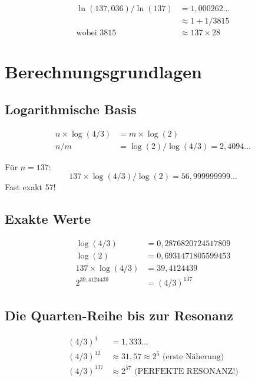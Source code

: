 	\begin{align}
		\ln(137{,}036) / \ln(137) &= 1{,}000262...\\
		&\approx 1 + 1/3815\\
		\text{wobei } 3815 &\approx 137 \times 28
	\end{align}
	
	\section{Berechnungsgrundlagen}
	
	\subsection{Logarithmische Basis}
	
	\begin{align}
		n \times \log(4/3) &= m \times \log(2)\\
		n/m &= \log(2)/\log(4/3) = 2{,}4094...
	\end{align}
	
	Für $n=137$:
	\begin{equation}
		137 \times \log(4/3) / \log(2) = 56{,}999999999...
	\end{equation}
	Fast exakt 57!
	
	\subsection{Exakte Werte}
	
	\begin{align}
		\log(4/3) &= 0{,}2876820724517809\\
		\log(2) &= 0{,}6931471805599453\\
		137 \times \log(4/3) &= 39{,}4124439\\
		2^{39{,}4124439} &= (4/3)^{137}
	\end{align}
	
	\subsection{Die Quarten-Reihe bis zur Resonanz}
	
	\begin{align}
		(4/3)^1 &= 1{,}333...\\
		(4/3)^{12} &\approx 31{,}57 \approx 2^5 \text{ (erste Näherung)}\\
		(4/3)^{137} &\approx 2^{57} \text{ (PERFEKTE RESONANZ!)}
	\end{align}
	
